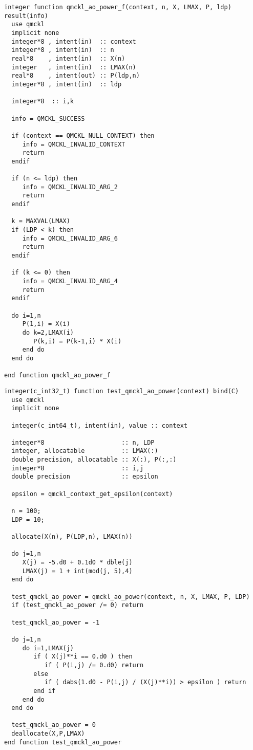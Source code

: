 \begin{verbatim}
integer function qmckl_ao_power_f(context, n, X, LMAX, P, ldp) result(info)
  use qmckl
  implicit none
  integer*8 , intent(in)  :: context
  integer*8 , intent(in)  :: n
  real*8    , intent(in)  :: X(n)
  integer   , intent(in)  :: LMAX(n)
  real*8    , intent(out) :: P(ldp,n)
  integer*8 , intent(in)  :: ldp

  integer*8  :: i,k

  info = QMCKL_SUCCESS

  if (context == QMCKL_NULL_CONTEXT) then
     info = QMCKL_INVALID_CONTEXT
     return
  endif

  if (n <= ldp) then
     info = QMCKL_INVALID_ARG_2
     return
  endif

  k = MAXVAL(LMAX)
  if (LDP < k) then
     info = QMCKL_INVALID_ARG_6
     return
  endif

  if (k <= 0) then
     info = QMCKL_INVALID_ARG_4
     return
  endif

  do i=1,n
     P(1,i) = X(i)
     do k=2,LMAX(i)
        P(k,i) = P(k-1,i) * X(i) 
     end do
  end do

end function qmckl_ao_power_f
\end{verbatim}

\begin{verbatim}
integer(c_int32_t) function test_qmckl_ao_power(context) bind(C)
  use qmckl
  implicit none

  integer(c_int64_t), intent(in), value :: context

  integer*8                     :: n, LDP 
  integer, allocatable          :: LMAX(:) 
  double precision, allocatable :: X(:), P(:,:)
  integer*8                     :: i,j
  double precision              :: epsilon

  epsilon = qmckl_context_get_epsilon(context)

  n = 100;
  LDP = 10;

  allocate(X(n), P(LDP,n), LMAX(n))

  do j=1,n
     X(j) = -5.d0 + 0.1d0 * dble(j)
     LMAX(j) = 1 + int(mod(j, 5),4)
  end do

  test_qmckl_ao_power = qmckl_ao_power(context, n, X, LMAX, P, LDP) 
  if (test_qmckl_ao_power /= 0) return

  test_qmckl_ao_power = -1

  do j=1,n
     do i=1,LMAX(j)
        if ( X(j)**i == 0.d0 ) then
           if ( P(i,j) /= 0.d0) return
        else
           if ( dabs(1.d0 - P(i,j) / (X(j)**i)) > epsilon ) return
        end if
     end do
  end do

  test_qmckl_ao_power = 0
  deallocate(X,P,LMAX)
end function test_qmckl_ao_power
\end{verbatim}

